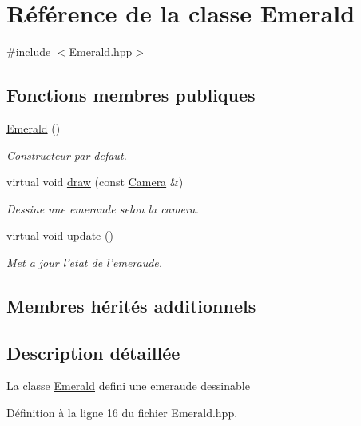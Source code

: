 \hypertarget{classEmerald}{\section{Référence de la classe Emerald}
\label{classEmerald}
}


{\ttfamily \#include $<$Emerald.\+hpp$>$}

\subsection*{Fonctions membres publiques}
\begin{DoxyCompactItemize}
\item 
\hyperlink{classEmerald_a0af7339a3dfdfb13610148bb3a16c920}{Emerald} ()
\begin{DoxyCompactList}\small\item\em Constructeur par defaut. \end{DoxyCompactList}\item 
virtual void \hyperlink{classEmerald_ae913346e203ed9a8115d890bd662ea41}{draw} (const \hyperlink{classCamera}{Camera} \&)
\begin{DoxyCompactList}\small\item\em Dessine une emeraude selon la camera. \end{DoxyCompactList}\item 
virtual void \hyperlink{classEmerald_ad997fe3bf39eb0556aefab1a91836895}{update} ()
\begin{DoxyCompactList}\small\item\em Met a jour l'etat de l'emeraude. \end{DoxyCompactList}\end{DoxyCompactItemize}
\subsection*{Membres hérités additionnels}


\subsection{Description détaillée}
La classe \hyperlink{classEmerald}{Emerald} defini une emeraude dessinable 

Définition à la ligne 16 du fichier Emerald.\+hpp.




